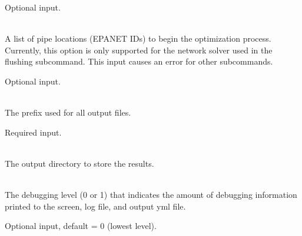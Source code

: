 \begin{description}[topsep=0pt,parsep=0.5em,itemsep=-0.4em]
\begin{description}[topsep=0pt,parsep=0.5em,itemsep=-0.4em]
\begin{description}[topsep=0pt,parsep=0.5em,itemsep=-0.4em]
        Optional input.
      \item[{pipes}]\hfill
\\A list of pipe locations (EPANET IDs) to begin the optimization
        process. Currently, this option is only supported for the
        network solver used in the flushing subcommand. This input causes an error for other subcommands.
        
        Optional input.
    \end{description}
  \end{description}
  \item[{configure}]\hfill
  \begin{description}[topsep=0pt,parsep=0.5em,itemsep=-0.4em]
    \item[{output prefix}]\hfill
\\The prefix used for all output files.
                
                Required input.
    \item[{output directory}]\hfill
      \\The output directory to store the results.
    \item[{debug}]\hfill
\\The debugging level (0 or 1) that indicates the amount of debugging 
                information printed to the screen, log file, and output yml file. 
                
                Optional input, default = 0 (lowest level).
  \end{description}
\end{description}
